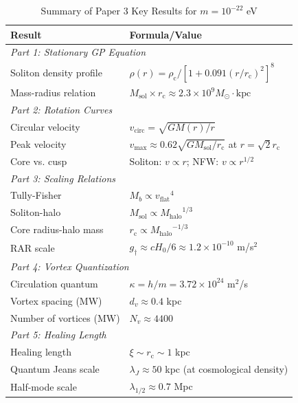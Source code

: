 \documentclass[11pt,a4paper]{article}
\newcommand{\ee}[1]{\times 10^{#1}}
\newcommand{\Msun}{\ensuremath{M_{\odot}}}
\newcommand{\Msol}{\ensuremath{M_{\mathrm{sol}}}}
\newcommand{\Mhalo}{\ensuremath{M_{\mathrm{halo}}}}
\newcommand{\rc}{\ensuremath{r_{\mathrm{c}}}}
\newcommand{\rhoc}{\ensuremath{\rho_{\mathrm{c}}}}
\newcommand{\vcirc}{\ensuremath{v_{\mathrm{circ}}}}
\newcommand{\vflat}{\ensuremath{v_{\mathrm{flat}}}}
\newcommand{\gdagger}{\ensuremath{g_{\dagger}}}
\theoremstyle{definition}
\theoremstyle{remark}
\begin{document}
\begin{table}[H]
\centering
\caption{Summary of Paper 3 Key Results for $m = 10^{-22}$ eV}
\label{tab:summary}
\begin{tabular}{@{}p{6cm}p{8cm}@{}}
\toprule
\textbf{Result} & \textbf{Formula/Value} \\
\midrule
\multicolumn{2}{l}{\textit{Part 1: Stationary GP Equation}} \\
Soliton density profile & $\rho(r) = \rhoc/[1 + 0.091(r/\rc)^2]^8$ \\
Mass-radius relation & $\Msol \times \rc \approx 2.3 \times 10^9 \Msun\cdot\text{kpc}$ \\
\midrule
\multicolumn{2}{l}{\textit{Part 2: Rotation Curves}} \\
Circular velocity & $\vcirc = \sqrt{GM(r)/r}$ \\
Peak velocity & $v_{\max} \approx 0.62\sqrt{G\Msol/\rc}$ at $r = \sqrt{2}\rc$ \\
Core vs. cusp & Soliton: $v \propto r$; NFW: $v \propto r^{1/2}$ \\
\midrule
\multicolumn{2}{l}{\textit{Part 3: Scaling Relations}} \\
Tully-Fisher & $M_b \propto \vflat^4$ \\
Soliton-halo & $\Msol \propto \Mhalo^{1/3}$ \\
Core radius-halo mass & $\rc \propto \Mhalo^{-1/3}$ \\
RAR scale & $\gdagger \approx cH_0/6 \approx 1.2\ee{-10}$ m/s$^2$ \\
\midrule
\multicolumn{2}{l}{\textit{Part 4: Vortex Quantization}} \\
Circulation quantum & $\kappa = h/m = 3.72\ee{24}$ m$^2$/s \\
Vortex spacing (MW) & $d_v \approx 0.4$ kpc \\
Number of vortices (MW) & $N_v \approx 4400$ \\
\midrule
\multicolumn{2}{l}{\textit{Part 5: Healing Length}} \\
Healing length & $\xi \sim \rc \sim 1$ kpc \\
Quantum Jeans scale & $\lambda_J \approx 50$ kpc (at cosmological density) \\
Half-mode scale & $\lambda_{1/2} \approx 0.7$ Mpc \\
\bottomrule
\end{tabular}
\end{table}

\end{document}
